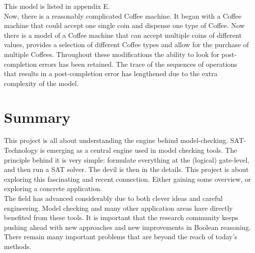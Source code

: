 \documentclass[a4paper,12pt]{extarticle}
\begin{document}
This model is listed in appendix E.\\

Now, there is a reasonably complicated Coffee machine. It began with a Coffee machine that could accept one single coin and dispense one type of Coffee. Now there is a model of a Coffee machine that can accept multiple coins of different values, provides a selection of different Coffee types and allow for the purchase of multiple Coffees. Throughout these modifications the ability to look for post-completion errors has been retained. The trace of the sequences of operations that results in a post-completion error has lengthened due to the extra complexity of the model.
\newpage
\section{Summary}
\label{summary}
This project is all about understanding the engine behind model-checking. SAT-Technology is emerging as a central engine used in model checking tools. The principle behind it is very simple: formulate everything at the (logical) gate-level, and then run a SAT solver. The devil is then in the details. This project is about exploring this fascinating and recent connection. Either gaining some overview, or exploring a concrete application.\\
The field has advanced considerably due to both clever ideas and careful engineering. Model checking and many other application areas have directly benefited from these tools. It is important that the research community keeps pushing ahead with new approaches and new improvements in Boolean reasoning. There remain many important problems that are beyond the reach of today's methods.
\newpage
\end{document}
